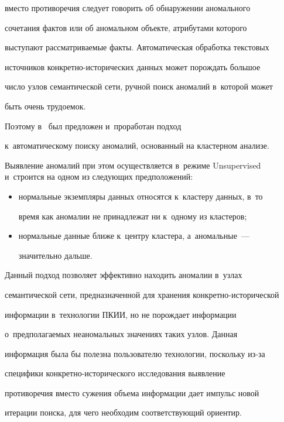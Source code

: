 вместо противоречия следует говорить об обнаружении аномального 


сочетания фактов или об аномальном объекте, атрибутами которого 


выступают рассматриваемые факты. Автоматическая обработка текстовых 


источников конкретно-исторических данных может порождать большое 


число узлов семантической сети, ручной поиск аномалий в~которой может 


быть очень трудоемок.




  Поэтому в~\cite{16-ad} был предложен и~проработан подход 


к~автоматическому поиску аномалий, основанный на кластерном анализе. 


Выявление аномалий при этом осуществляется в~режиме Unsupervised и~строится на одном из сле\-ду\-ющих предположений:


  \begin{itemize}


\item нормальные экземпляры данных относятся к~кластеру данных, в~то 


время как аномалии не принадлежат ни к~одному из кластеров;


\item нормальные данные ближе к~центру кластера, а~аномальные~--- 


значительно дальше.


\end{itemize}


  


  Данный подход позволяет эффективно находить аномалии в~узлах 


семантической сети, предназначенной для хранения конкретно-исторической 


информации в~технологии ПКИИ, но не порождает информации 


о~предполагаемых неаномальных значениях таких узлов. Данная 


информация была бы полезна пользователю технологии, поскольку из-за 


специфики кон\-крет\-но-ис\-то\-ри\-че\-ско\-го исследования выявление 


противоречия вместо сужения объема информации дает импульс новой 


итерации поиска, для чего необходим соответствующий ориентир. 


